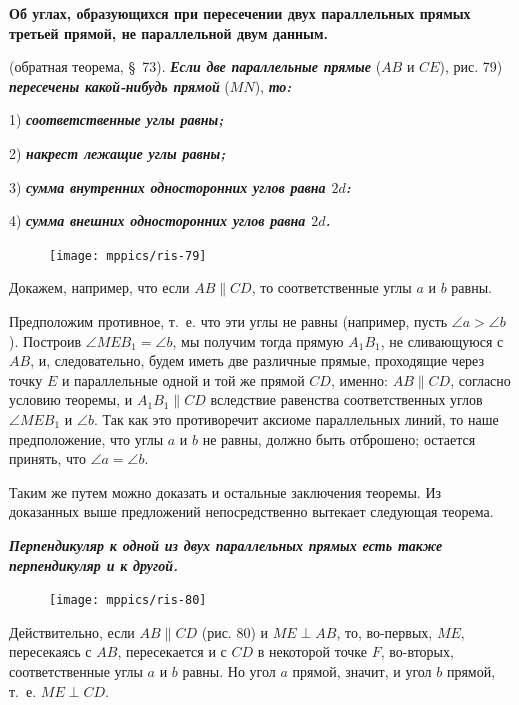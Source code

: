 \documentclass[oneside]{book}
\begin{document}
\textbf{Об углах, образующихся при пересечении двух параллельных прямых третьей прямой, не параллельной двум данным.}

 (обратная теорема, §~73).
\textbf{\emph{Если две параллельные прямые}} ($AB$ и $CE$), рис. 79) \textbf{\emph{пересечены какой-нибудь прямой}} ($MN$), \textbf{\emph{то:}}


1) \textbf{\emph{соответственные углы равны;}}

2) \textbf{\emph{накрест лежащие углы равны;}}

3) \textbf{\emph{сумма внутренних односторонних углов равна $2d$:}}

4) \textbf{\emph{сумма внешних односторонних углов равна $2d$.}}

\begin{figure}
\centering
\texttt{[image: mppics/ris-79]}
\caption{}
\end{figure}

Докажем, например, что если $AB\parallel CD$, то соответственные углы $a$ и $b$ равны.

Предположим противное, т.~е. что эти углы не равны (например, пусть $\angle a > \angle b$).
Построив $\angle MEB_1 = \angle b$, мы получим тогда прямую $A_1B_1$, не сливающуюся с $AB$, и, следовательно, будем иметь две различные прямые, проходящие через точку $E$ и параллельные одной и той же прямой $CD$, именно:
$AB\parallel CD$, согласно условию теоремы, и $A_1B_1\parallel CD$ вследствие равенства соответственных углов $\angle MEB_1$ и $\angle b$.
Так как это противоречит аксиоме параллельных линий, то наше предположение, что углы $a$ и $b$ не равны, должно быть отброшено;
остается принять, что $\angle a = \angle b$.

Таким же путем можно доказать и остальные заключения теоремы.
Из доказанных выше предложений непосредственно вытекает следующая теорема.

\textbf{\emph{Перпендикуляр к одной из двух параллельных прямых есть также перпендикуляр и к другой.}}

\begin{figure}
\centering
\texttt{[image: mppics/ris-80]}
\caption{}
\end{figure}

Действительно, если $AB\parallel CD$ (рис. 80) и $ME\perp AB$, то, во-первых, $ME$, пересекаясь с $AB$, пересекается и с $CD$ в некоторой точке $F$, во-вторых, соответственные углы $a$ и $b$ равны.
Но угол $a$ прямой, значит, и угол $b$ прямой, т.~е.
$ME\perp CD$.
\end{document}
